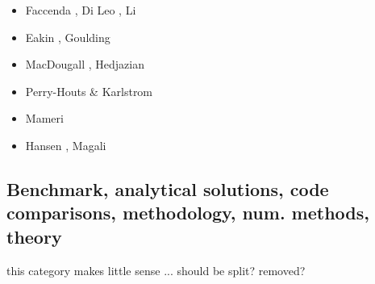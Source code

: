 \begin{scriptsize}
\begin{itemize}
\item[\twothousandfourteen] Faccenda \cite{facc14}, Di Leo \etal \cite{diwl14}, Li \etal \cite{lidr14}
\item[\twothousandfifteen] Eakin \etal \cite{ealw15}, Goulding \etal \cite{gorc15}
\item[\twothousandseventeen] MacDougall \etal \cite{majf17}, Hedjazian \etal \cite{hegd17}
\item[\twothousandeighteen] Perry-Houts \& Karlstrom \cite{peka18}
\item[\twothousandnineteen] Mameri \etal \cite{mats19}
\item[\twothousandtwentyone] Hansen \etal \cite{hafw21}, Magali \etal \cite{mabh21}
\end{itemize}
\end{scriptsize}

\subsection{Benchmark, analytical solutions, code comparisons, methodology, num. methods, theory}

{\color{red} this category makes little sense ... should be split? removed? }

